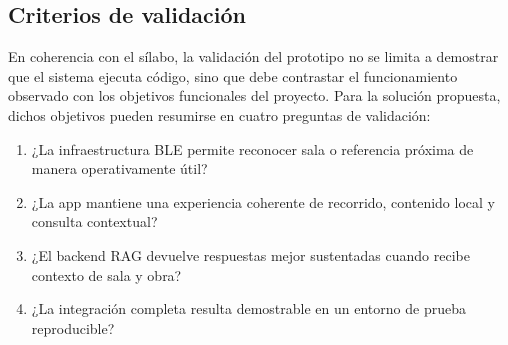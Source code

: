 \subsection{Criterios de validación}

En coherencia con el sílabo, la validación del prototipo no se limita a demostrar que el sistema ejecuta código, sino que debe contrastar el funcionamiento observado con los objetivos funcionales del proyecto. Para la solución propuesta, dichos objetivos pueden resumirse en cuatro preguntas de validación:

\begin{enumerate}
    \item ¿La infraestructura BLE permite reconocer sala o referencia próxima de manera operativamente útil?
    \item ¿La app mantiene una experiencia coherente de recorrido, contenido local y consulta contextual?
    \item ¿El backend RAG devuelve respuestas mejor sustentadas cuando recibe contexto de sala y obra?
    \item ¿La integración completa resulta demostrable en un entorno de prueba reproducible?
\end{enumerate}

